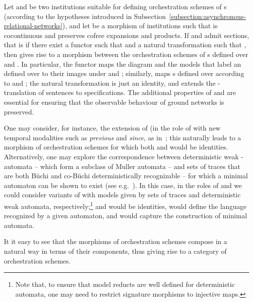 \documentclass{LMCS}
\begin{document}
  \begin{exa}
    \label{example:morphisms-of-orchestration-schemes-of-ARNs}
    Let  and  be two institutions suitable for defining orchestration schemes of s (according to the hypotheses introduced in Subsection~\ref{subsection:asynchronous-relational-networks}), and let  be a morphism of institutions  such that  is cocontinuous and  preserves cofree expansions and products.
    If  and  admit sections, that is if there exist a functor  such that  and a natural transformation  such that , then  gives rise to a morphism  between the orchestration schemes of s defined over  and .
    In particular, the functor  maps the diagram and the models that label an  defined over  to their images under  and ; similarly,  maps s defined over  according to  and ; the natural transformation  is just an identity, and  extends the \nb-translation of sentences to specifications. The additional properties of  and  are essential for ensuring that the observable behaviour of ground networks is preserved.

    One may consider, for instance, the extension of  (in the role of  with new temporal modalities such as \emph{previous} and \emph{since}, as in~\cite{Knapp-Marczynski-Wirsing-Zawlocki:A-heterogeneous-approach-to-service-oriented-systems-specification-2010}; this naturally leads to a morphism of orchestration schemes for which both  and  would be identities.
    Alternatively, one may explore the correspondence between deterministic weak \nb-automata -- which form a subclass of Muller automata -- and sets of traces that are both B\"{u}chi and co\nb-B\"{u}chi deterministically recognizable -- for which a minimal automaton can be shown to exist (see e.g.~\cite{Maler-Staiger:Syntactic-congruences-for-omega-languages-1997,Loding:Efficient-minimization-of-deterministic-weak-omega-automata-2001}). In this case, in the roles of  and  we could consider variants of  with models given by sets of traces and deterministic weak automata, respectively;\footnote{Note that, to ensure that model reducts are well defined for deterministic automata, one may need to restrict signature morphisms to injective maps.}  and  would be identities,  would define the language recognized by a given automaton, and  would capture the construction of minimal automata.
  \end{exa}

  It it easy to see that the morphisms of orchestration schemes compose in a natural way in terms of their components, thus giving rise to a category of orchestration schemes.
\end{document}
